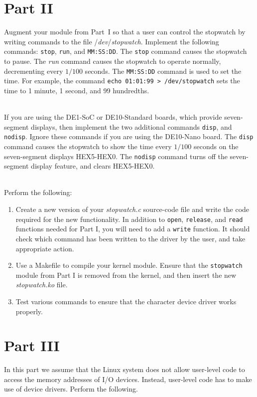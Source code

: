 \documentclass[epsfig,10pt,fullpage]{article}
\begin{document}
\section*{Part II}
\noindent
Augment your module from Part~I so that a user can control the stopwatch by writing
commands to the file /{\it dev}/{\it stopwatch}. Implement the following commands:
\texttt{stop}, \texttt{run}, and \texttt{MM:SS:DD}. The \texttt{stop} command causes the 
stopwatch to pause. The {\it run} command causes the stopwatch to operate normally, 
decrementing every $1/100$ seconds. The \texttt{MM:SS:DD} command is used to set the time.
For example, the command \texttt{echo 01:01:99 > /dev/stopwatch} sets the time to 1 
minute, 1 second, and 99 hundredths. 

~\\
\noindent
If you are using the DE1-SoC or DE10-Standard boards, which provide seven-segment displays,
then implement the two additional commands \texttt{disp}, and \texttt{nodisp}. Ignore these
commands if you are using the DE10-Nano board.
The \texttt{disp} command causes the stopwatch to show the time every $1/100$
seconds on the seven-segment displays HEX5-HEX0. The \texttt{nodisp} command turns off the
seven-segment display feature, and clears HEX5-HEX0. 

~\\
\noindent
Perform the following:

\begin{enumerate}
\item Create a new version of your {\it stopwatch.c} source-code file and write the code 
required for the new functionality. In addition to \texttt{open}, \texttt{release}, and 
\texttt{read} functions needed for Part I, you will need to add a \texttt{write} function. 
It should check which command has been written to the driver by the user, and take
appropriate action.

\item Use a Makefile to compile your kernel module. Ensure that the \texttt{stopwatch}
module from Part I is removed from the kernel, and then insert the new {\it stopwatch.ko} file. 

\item Test various commands to ensure that the character device driver works properly. 
\end{enumerate}

\section*{Part III}
\noindent
In this part we assume that the Linux system does not allow user-level code to access the
memory addresses of I/O devices. Instead, user-level code has to make use of device
drivers. Perform the following. 
\end{document}
